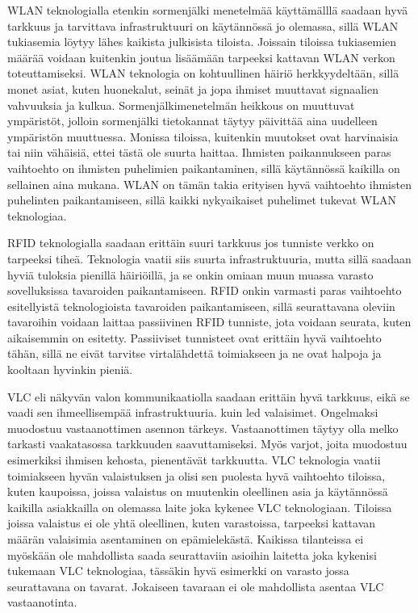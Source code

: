 WLAN teknologialla etenkin sormenjälki menetelmää käyttämälllä saadaan hyvä tarkkuus ja tarvittava infrastruktuuri on käytännössä jo olemassa, sillä WLAN tukiasemia löytyy lähes kaikista julkisista tiloista. Joissain tiloissa tukiasemien määrää voidaan kuitenkin joutua lisäämään tarpeeksi kattavan WLAN verkon toteuttamiseksi. WLAN teknologia on kohtuullinen häiriö herkkyydeltään, sillä monet asiat, kuten huonekalut, seinät ja jopa ihmiset muuttavat signaalien vahvuuksia ja kulkua. Sormenjälkimenetelmän heikkous on muuttuvat ympäristöt, jolloin sormenjälki tietokannat täytyy päivittää aina uudelleen ympäristön muuttuessa. Monissa tiloissa, kuitenkin muutokset ovat harvinaisia tai niin vähäisiä, ettei tästä ole suurta haittaa. Ihmisten paikannukseen paras vaihtoehto on ihmisten puhelimien paikantaminen, sillä käytännössä kaikilla on sellainen aina mukana. WLAN on tämän takia erityisen hyvä vaihtoehto ihmisten puhelinten paikantamiseen, sillä kaikki nykyaikaiset puhelimet tukevat WLAN teknologiaa.

RFID teknologialla saadaan erittäin suuri tarkkuus jos tunniste verkko on tarpeeksi tiheä. Teknologia vaatii siis suurta infrastruktuuria, mutta sillä saadaan hyviä tuloksia pienillä häiriöillä, ja se onkin omiaan muun muassa varasto sovelluksissa tavaroiden paikantamiseen.
RFID onkin varmasti paras vaihtoehto esitellyistä teknologioista tavaroiden paikantamiseen, sillä seurattavana oleviin tavaroihin voidaan laittaa passiivinen RFID tunniste, jota voidaan seurata, kuten aikaisemmin on esitetty. Passiiviset tunnisteet ovat erittäin hyvä vaihtoehto tähän, sillä ne eivät tarvitse virtalähdettä toimiakseen ja ne ovat halpoja ja kooltaan hyvinkin pieniä\cite{F}.

VLC eli näkyvän valon kommunikaatiolla saadaan erittäin hyvä tarkkuus, eikä se vaadi sen ihmeellisempää infrastruktuuria. kuin led valaisimet. Ongelmaksi muodostuu vastaanottimen asennon tärkeys. Vastaanottimen täytyy olla melko tarkasti vaakatasossa tarkkuuden saavuttamiseksi. Myös varjot, joita muodostuu esimerkiksi ihmisen kehosta, pienentävät tarkkuutta.
VLC teknologia vaatii toimiakseen hyvän valaistuksen ja olisi sen puolesta hyvä vaihtoehto tiloissa, kuten kaupoissa, joissa valaistus on muutenkin oleellinen asia ja käytännössä kaikilla asiakkailla on olemassa laite joka kykenee VLC teknologiaan. Tiloissa joissa valaistus ei ole yhtä oleellinen, kuten varastoissa, tarpeeksi kattavan määrän valaisimia asentaminen on epämielekästä. Kaikissa tilanteissa ei myöskään ole mahdollista saada seurattaviin asioihin laitetta joka kykenisi tukemaan VLC teknologiaa, tässäkin hyvä esimerkki on varasto jossa seurattavana on tavarat. Jokaiseen tavaraan ei ole mahdollista asentaa VLC vastaanotinta.

